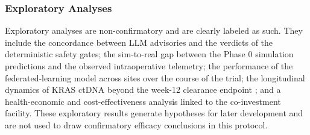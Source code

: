 \subsubsection{Exploratory Analyses}

Exploratory analyses are non-confirmatory and are clearly labeled as such. They
include the concordance between LLM advisories and the verdicts of the deterministic
safety gates; the sim-to-real gap between the Phase 0 simulation predictions and the
observed intraoperative telemetry; the performance of the federated-learning model
across sites over the course of the trial; the longitudinal dynamics of KRAS ctDNA
beyond the week-12 clearance endpoint \cite{Tie2019ctdna}; and a health-economic and
cost-effectiveness analysis linked to the co-investment facility. These exploratory
results generate hypotheses for later development and are not used to draw confirmatory
efficacy conclusions in this protocol.
